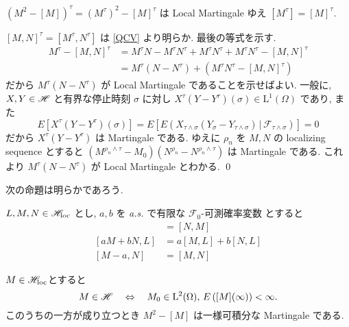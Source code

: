 \documentclass{ltjsarticle}
\begin{document}
\begin{prf}
	\( ( M^2 - [M] )^{\tau} = ( M^{\tau} )^2 - [M]^{\tau} \) は Local Martingale ゆえ
	\( [ M^{\tau} ] = [M]^{\tau} \). 
	
	\( [M, N]^{\tau} = [M^{\tau}, N^{\tau}] \) は \eqref{QCV} より明らか.
	最後の等式を示す.
	\begin{align*}
		M^{\tau} - [M, N]^{\tau} & =	 M^{\tau}N - M^{\tau}N^{\tau} + M^{\tau}N^{\tau}
		+ M^{\tau}N^{\tau} - [M, N]^{\tau}
		\\
		                         & =	M^{\tau} ( N - N^{\tau} ) 
		+ ( M^{\tau}N^{\tau} - [M, N]^{\tau} )
	\end{align*}
	だから \( M^{\tau} ( N - N^{\tau} ) \) が Local Martingale であることを示せばよい.
	一般に, \( X, Y \in \mathscr{H} \) と有界な停止時刻 \( \sigma \) に対し
	\( X^{\tau}( Y - Y^{\tau} )( \sigma ) \in \mathrm{L}^1(\Omega) \) であり, また
	\[
		E \left[ X^{\tau}( Y - Y^{\tau} )( \sigma ) \right]
		=	E \left[ E \left( X_{ \tau \wedge \sigma }
			\left( Y_{\sigma} - Y_{ \tau \wedge \sigma } \right)
			\,|\, \mathscr{F}_{ \tau \wedge \sigma } \right) \right]
		=	0
	\]
	だから \( X^{\tau}( Y - Y^{\tau} ) \) は Martingale である.
	ゆえに \( \rho_n \) を \( M, N \) の localizing sequence とすると
	\( ( M^{ \rho_n \wedge \tau } - M_0 ) ( N^{ \rho_n } - N^{ \rho_n \wedge \tau }) \) 
	は Martingale である.
	これより
	\( M^{\tau} ( N - N^{\tau} ) \)
	が Local Martingale とわかる.
	\qed\end{prf}	%
%

次の命題は明らかであろう.
\begin{prp}
	\( L, M, N \in \mathscr{H}_{\mathrm{loc}} \) とし, \( a,b \) を \textit{a.s.} で有限な \( \mathscr{F}_0 \)-可測確率変数 とすると
	\begin{align*}
		[M, N]       & =	[N, M]            \\
		[aM + bN, L] & = a[M, L] + b[N, L] \\
		[M - a, N]   & =	[M, N]
	\end{align*}
\end{prp}


\begin{prp}[\( \Hs \) の特徴付け]	\label{characterization of Hs}
	\( M \in \mathscr{H}_{\mathrm{loc}} \)とすると
	\[
		M \in \mathscr{H}
		\quad \Leftrightarrow \quad
		M_0 \in \mathrm{L}^2 ( \Omega ),\, E \left( [M] ( \infty ) \right) < \infty .
	\]
	このうちの一方が成り立つとき \( M^2 - [M] \) は一様可積分な Martingale である. 
\end{prp}
\end{document}
